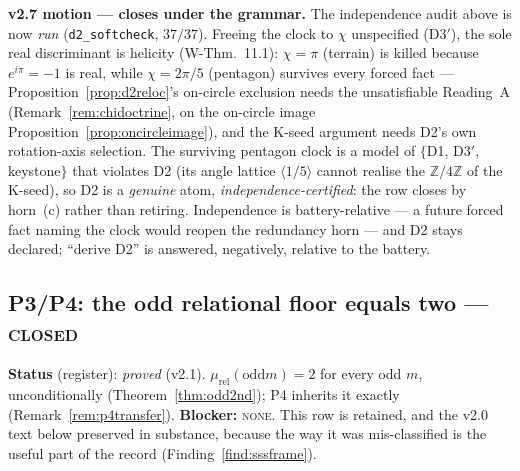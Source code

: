 \documentclass[11pt]{article}
\newcommand{\Z}{\mathbb{Z}}
\theoremstyle{plain}
\theoremstyle{definition}
\theoremstyle{remark}
\begin{document}
\smallskip\noindent
\textbf{v2.7 motion --- closes under the grammar.} The independence audit above is
now \emph{run} (\texttt{d2\_softcheck}, $37/37$). Freeing the clock to $\chi$
unspecified (D3$'$), the sole real discriminant is helicity
(W-Thm.~11.1): $\chi=\pi$ (terrain) is
killed because $e^{i\pi}=-1$ is real, while $\chi=2\pi/5$ (pentagon) survives every
forced fact --- Proposition~\ref{prop:d2reloc}'s on-circle exclusion needs the
unsatisfiable Reading~A (Remark~\ref{rem:chidoctrine}, on the on-circle image
Proposition~\ref{prop:oncircleimage}), and the K-seed argument needs
D2's own rotation-axis selection. The surviving pentagon clock is a model of
$\{$D1, D3$'$, keystone$\}$ that violates D2 (its angle lattice
$\langle1/5\rangle$ cannot realise the $\Z/4\Z$ of the K-seed), so D2 is a
\emph{genuine} atom, \emph{independence-certified}: the row closes by horn~(c)
rather than retiring. Independence is battery-relative --- a future forced fact
naming the clock would reopen the redundancy horn --- and D2 stays declared;
``derive D2'' is answered, negatively, relative to the battery.

\subsection{P3/P4: the odd relational floor equals two --- \textsc{closed}}\label{blk:odd2}
\textbf{Status} (register): \emph{proved} (v2.1). $\mu_{\mathrm{rel}}(\text{odd
}m)=2$ for every odd $m$, unconditionally (Theorem~\ref{thm:odd2nd}); P4
inherits it exactly (Remark~\ref{rem:p4transfer}). \textbf{Blocker:}
\textsc{none}. This row is retained, and the v2.0 text below preserved in
substance, because the way it was mis-classified is the useful part of the
record (Finding~\ref{find:sssframe}).
\end{document}
